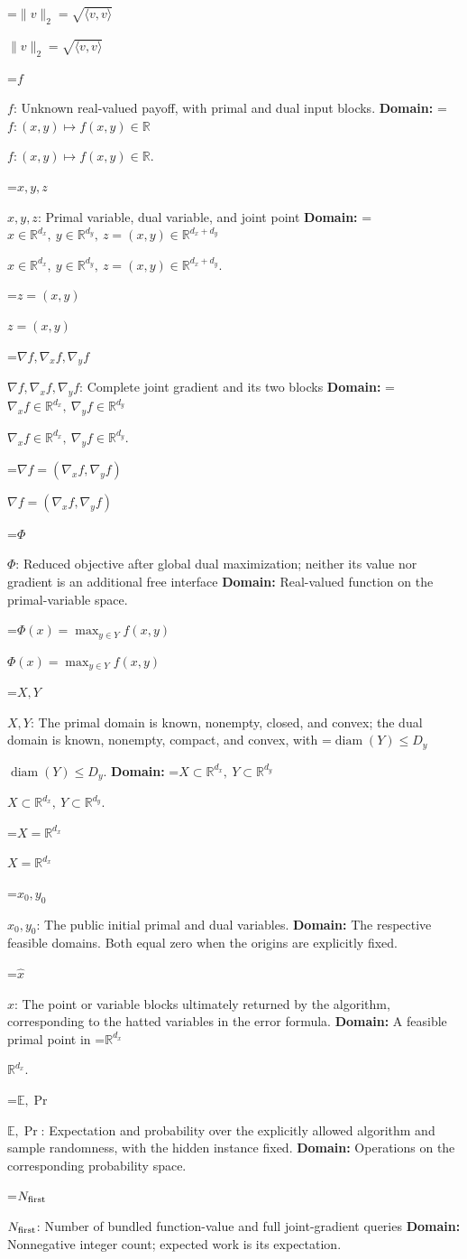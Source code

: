 \documentclass[10pt,a4paper]{article}
\newcommand{\AtlasMath}[1]{\par\begingroup\centering\setbox0=\hbox{$\displaystyle #1$}\ifdim\wd0>1.4\linewidth\typeout{ATLAS WIDE FORMULA: \the\wd0}\fi\ifdim\wd0>\linewidth\resizebox{\linewidth}{!}{\box0}\else\box0\fi\par\endgroup}
\newcommand{\AtlasInlineMath}[1]{\begingroup\setbox0=\hbox{$#1$}\ifdim\wd0>.4\linewidth\endgroup\AtlasMath{#1}\else\endgroup$#1$\fi}
\begin{document}
\AtlasInlineMath{\|v\|_2=\sqrt{\langle v,v\rangle}}

\AtlasInlineMath{f}: Unknown real-valued payoff, with primal and dual input blocks. \textbf{Domain:} \AtlasInlineMath{f:(x,y)\mapsto f(x,y)\in\mathbb R}.

\AtlasInlineMath{x,y,z}: Primal variable, dual variable, and joint point \textbf{Domain:} \AtlasInlineMath{x\in\mathbb R^{d_x},\ y\in\mathbb R^{d_y},\ z=(x,y)\in\mathbb R^{d_x+d_y}}.

\AtlasInlineMath{z=(x,y)}

\AtlasInlineMath{\nabla f,\nabla_x f,\nabla_y f}: Complete joint gradient and its two blocks \textbf{Domain:} \AtlasInlineMath{\nabla_x f\in\mathbb R^{d_x},\ \nabla_y f\in\mathbb R^{d_y}}.

\AtlasInlineMath{\nabla f=(\nabla_x f,\nabla_y f)}

\AtlasInlineMath{\Phi}: Reduced objective after global dual maximization; neither its value nor gradient is an additional free interface \textbf{Domain:} Real-valued function on the primal-variable space.

\AtlasInlineMath{\Phi(x)=\max_{y\in Y}f(x,y)}

\AtlasInlineMath{X,Y}: The primal domain is known, nonempty, closed, and convex; the dual domain is known, nonempty, compact, and convex, with \AtlasInlineMath{\operatorname{diam}(Y)\le D_y}. \textbf{Domain:} \AtlasInlineMath{X\subset\mathbb R^{d_x},\ Y\subset\mathbb R^{d_y}}.

\AtlasInlineMath{X=\mathbb R^{d_x}}

\AtlasInlineMath{x_0,y_0}: The public initial primal and dual variables. \textbf{Domain:} The respective feasible domains. Both equal zero when the origins are explicitly fixed.

\AtlasInlineMath{\widehat x}: The point or variable blocks ultimately returned by the algorithm, corresponding to the hatted variables in the error formula. \textbf{Domain:} A feasible primal point in \AtlasInlineMath{\mathbb R^{d_x}}.

\AtlasInlineMath{\mathbb E,\Pr}: Expectation and probability over the explicitly allowed algorithm and sample randomness, with the hidden instance fixed. \textbf{Domain:} Operations on the corresponding probability space.

\AtlasInlineMath{N_{\rm first}}: Number of bundled function-value and full joint-gradient queries \textbf{Domain:} Nonnegative integer count; expected work is its expectation.
\end{document}
